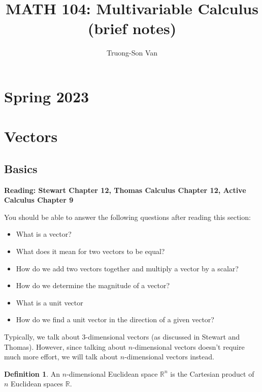 \documentclass[
]{article}
\title{MATH 104: Multivariable Calculus (brief notes)}
\author{Truong-Son Van}
\date{}
\theoremstyle{definition}
\newtheorem{definition}{Definition}[section]
\theoremstyle{definition}
\theoremstyle{definition}
\theoremstyle{definition}
\theoremstyle{remark}
\begin{document}
\maketitle

{
\setcounter{tocdepth}{2}
\tableofcontents
}
\hypertarget{spring-2023}{%
\section*{Spring 2023}\label{spring-2023}}

\newpage

\newcommand{\vectorproj}[2][]{\mathrm{proj}_{\vect{#1}}\vect{#2}}
\newcommand{\vectorcomp}[2][]{\mathrm{comp}_{\vect{#1}}\vect{#2}}
\newcommand{\vect}{\mathbf}
\newcommand{\R}{\mathbb{R}}

\hypertarget{vectors}{%
\section{Vectors}\label{vectors}}

\hypertarget{basics}{%
\subsection{Basics}\label{basics}}

\textbf{Reading: Stewart Chapter 12, Thomas Calculus Chapter 12,
Active Calculus Chapter 9}

You should be able to answer the following questions after reading this section:

\begin{itemize}
\item
  What is a vector?
\item
  What does it mean for two vectors to be equal?
\item
  How do we add two vectors together and multiply a vector by a scalar?
\item
  How do we determine the magnitude of a vector?
\item
  What is a unit vector
\item
  How do we find a unit vector in the direction of a given vector?
\end{itemize}

Typically, we talk about 3-dimensional vectors (as discussed in Stewart and Thomas).
However, since talking about \(n\)-dimensional vectors doesn't
require much more effort,
we will talk about \(n\)-dimensional vectors instead.

\begin{definition}
An \(n\)-dimensional Euclidean space \(\mathbb{R}^n\)
is the Cartesian product of \(n\) Euclidean spaces \(\mathbb{R}\).
\end{definition}
\end{document}
